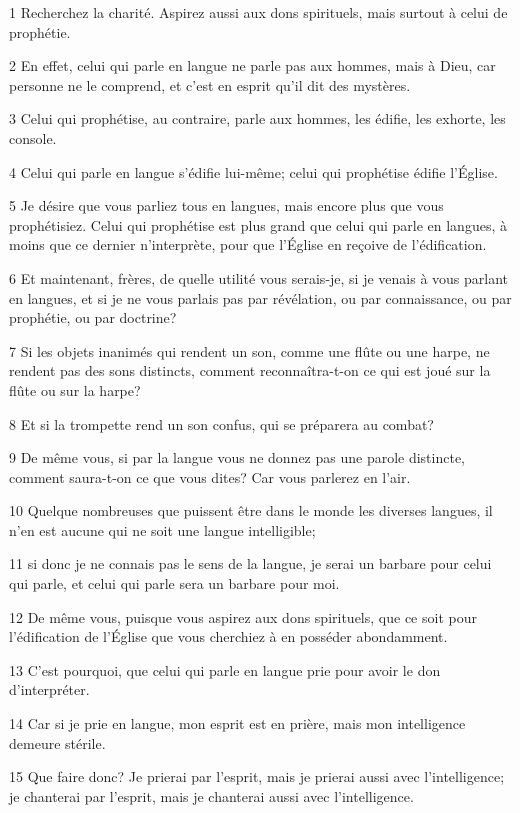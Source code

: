 \par 1 Recherchez la charité. Aspirez aussi aux dons spirituels, mais surtout à celui de prophétie.
\par 2 En effet, celui qui parle en langue ne parle pas aux hommes, mais à Dieu, car personne ne le comprend, et c'est en esprit qu'il dit des mystères.
\par 3 Celui qui prophétise, au contraire, parle aux hommes, les édifie, les exhorte, les console.
\par 4 Celui qui parle en langue s'édifie lui-même; celui qui prophétise édifie l'Église.
\par 5 Je désire que vous parliez tous en langues, mais encore plus que vous prophétisiez. Celui qui prophétise est plus grand que celui qui parle en langues, à moins que ce dernier n'interprète, pour que l'Église en reçoive de l'édification.
\par 6 Et maintenant, frères, de quelle utilité vous serais-je, si je venais à vous parlant en langues, et si je ne vous parlais pas par révélation, ou par connaissance, ou par prophétie, ou par doctrine?
\par 7 Si les objets inanimés qui rendent un son, comme une flûte ou une harpe, ne rendent pas des sons distincts, comment reconnaîtra-t-on ce qui est joué sur la flûte ou sur la harpe?
\par 8 Et si la trompette rend un son confus, qui se préparera au combat?
\par 9 De même vous, si par la langue vous ne donnez pas une parole distincte, comment saura-t-on ce que vous dites? Car vous parlerez en l'air.
\par 10 Quelque nombreuses que puissent être dans le monde les diverses langues, il n'en est aucune qui ne soit une langue intelligible;
\par 11 si donc je ne connais pas le sens de la langue, je serai un barbare pour celui qui parle, et celui qui parle sera un barbare pour moi.
\par 12 De même vous, puisque vous aspirez aux dons spirituels, que ce soit pour l'édification de l'Église que vous cherchiez à en posséder abondamment.
\par 13 C'est pourquoi, que celui qui parle en langue prie pour avoir le don d'interpréter.
\par 14 Car si je prie en langue, mon esprit est en prière, mais mon intelligence demeure stérile.
\par 15 Que faire donc? Je prierai par l'esprit, mais je prierai aussi avec l'intelligence; je chanterai par l'esprit, mais je chanterai aussi avec l'intelligence.
